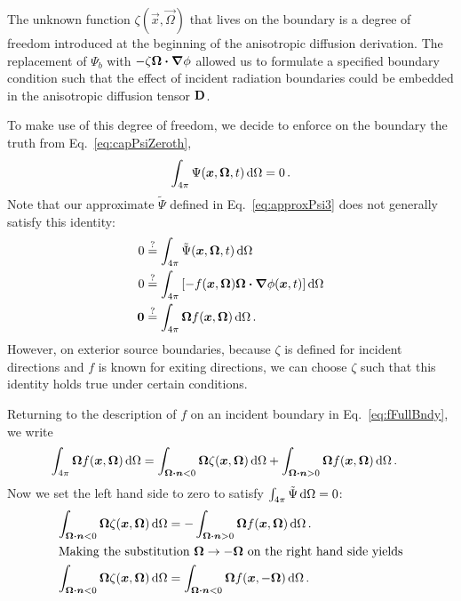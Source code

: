 The unknown function $\zeta(\vec{x}, \vec{\Omega})$ that lives on the boundary
is a degree of freedom introduced at the beginning of the anisotropic
diffusion derivation. The replacement of $\Psi_b$ with $-\zeta \bm{\Omega} \bm{\cdot}
\bm{\nabla} \phi$ allowed us to formulate a specified boundary condition
such that the effect of incident radiation boundaries could be embedded in the
anisotropic diffusion tensor $\mathbf{D}$.

To make use of this degree of freedom, we decide to enforce on the boundary the
truth from Eq.~\eqref{eq:capPsiZeroth},
\begin{equation*}
  \int_{4\pi} \Psi(\bm{x}, \bm{\Omega}, t) \mathop{}\!\mathrm{d}\Omega
  = 0 \,.
\end{equation*}
Note that our approximate $\tilde\Psi$ defined in Eq.~\eqref{eq:approxPsi3}
does not generally satisfy this identity:
\begin{align*}
  0
&\stackrel{\mathrm{?}}{=} \int_{4\pi} \tilde\Psi(\bm{x}, \bm{\Omega}, t) \mathop{}\!\mathrm{d}\Omega
\\
0 &\stackrel{\mathrm{?}}{=} \int_{4\pi} \left[ - f(\bm{x}, \bm{\Omega}) \bm{\Omega}
\bm{\cdot} \bm{\nabla} \phi(\bm{x}, t)\right]
\mathop{}\!\mathrm{d}\Omega
\\
\bm{0} &\stackrel{\mathrm{?}}{=} \int_{4\pi} \bm{\Omega} f(\bm{x}, \bm{\Omega})\mathop{}\!\mathrm{d}\Omega \,.
\end{align*}
However, on exterior source boundaries, because $\zeta$ is defined for incident
directions and $f$ is known for exiting directions, we can choose $\zeta$ such
that this identity holds true under certain conditions.

Returning to the description of $f$ on an incident boundary in
Eq.~\eqref{eq:fFullBndy}, we write
\begin{align*}
  \int_{4\pi} \bm{\Omega} f(\bm{x}, \bm{\Omega})\mathop{}\!\mathrm{d}\Omega
  &= \int_{\bm{\Omega} \bm{\cdot} \bm{n} < 0}
  \bm{\Omega} \zeta(\bm{x}, \bm{\Omega})\mathop{}\!\mathrm{d}\Omega
  + \int_{\bm{\Omega} \bm{\cdot} \bm{n} > 0}
  \bm{\Omega} f(\bm{x}, \bm{\Omega})\mathop{}\!\mathrm{d}\Omega\,.
\end{align*}
Now we set the left hand side to zero to satisfy $\int_{4\pi} \tilde\Psi \mathop{}\!\mathrm{d}\Omega = 0$:
\begin{align}
  \label{eq:zetaCondition1}
  \int_{\bm{\Omega} \bm{\cdot} \bm{n} < 0}
  \bm{\Omega} \zeta(\bm{x}, \bm{\Omega})\mathop{}\!\mathrm{d}\Omega
  &= -\int_{\bm{\Omega} \bm{\cdot} \bm{n} > 0}
  \bm{\Omega} f(\bm{x}, \bm{\Omega})\mathop{}\!\mathrm{d}\Omega \,.
  \\ 
  \intertext{Making the substitution $\bm{\Omega}\to -\bm{\Omega}$ on the
  right hand side yields}
  \label{eq:zetaCondition2}
  \int_{\bm{\Omega} \bm{\cdot} \bm{n} < 0}
  \bm{\Omega} \zeta(\bm{x}, \bm{\Omega})\mathop{}\!\mathrm{d}\Omega
  &= \int_{\bm{\Omega} \bm{\cdot} \bm{n} < 0}
  \bm{\Omega} f(\bm{x}, -\bm{\Omega})\mathop{}\!\mathrm{d}\Omega \,.
\end{align}

